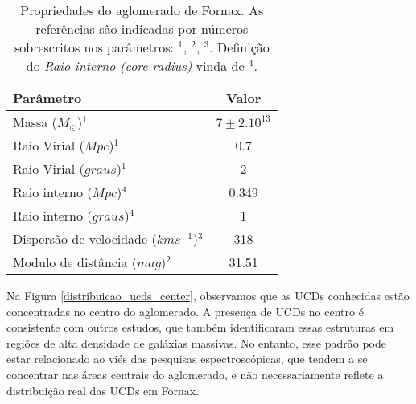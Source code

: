 \begin{table}[!ht]
    \centering    
    \caption{Propriedades do aglomerado de Fornax. As referências são indicadas por números sobrescritos nos parâmetros: $^1$\citealp{Drinkwater_2001}, $^2$\citealp{Blakeslee_2009}, $^3$\citealp{Maddox_2019}. Definição do \textit{Raio interno (core radius)} vinda de $^4$\cite{Saifollahi_2021}.}   
    \begin{tabular}{lc}
        \toprule
        Parâmetro &  Valor\\
        \midrule
        Massa ($M_\odot$)$^1$ & $7\pm 2. 10^{13}$ \\
        Raio Virial ($Mpc$)$^1$ & 0.7 \\
        Raio Virial ($graus$)$^1$ & 2 \\
        Raio interno ($Mpc$)$^4$ & 0.349 \\
        Raio interno ($graus$)$^4$ & 1 \\
        Dispersão de velocidade ($km s^{-1}$)$^3$ & 318 \\
        Modulo de distância ($mag$)$^2$ & 31.51 \\
        \bottomrule
    \end{tabular}
    \label{tab:properties_fornax}
\end{table}

Na Figura \ref{distribuicao_ucds_center}, observamos que as UCDs conhecidas estão concentradas no centro do aglomerado. A presença de UCDs no centro é consistente com outros estudos, que também identificaram essas estruturas em regiões de alta densidade de galáxias massivas. No entanto, esse padrão pode estar relacionado ao viés das pesquisas espectroscópicas, que tendem a se concentrar nas áreas centrais do aglomerado, e não necessariamente reflete a distribuição real das UCDs em Fornax.


